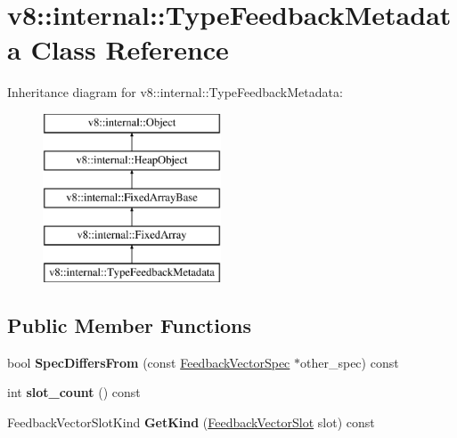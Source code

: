 \hypertarget{classv8_1_1internal_1_1_type_feedback_metadata}{}\section{v8\+:\+:internal\+:\+:Type\+Feedback\+Metadata Class Reference}
\label{classv8_1_1internal_1_1_type_feedback_metadata}
Inheritance diagram for v8\+:\+:internal\+:\+:Type\+Feedback\+Metadata\+:\begin{figure}[H]
\begin{center}
\leavevmode
\includegraphics[height=5.000000cm]{classv8_1_1internal_1_1_type_feedback_metadata}
\end{center}
\end{figure}
\subsection*{Public Member Functions}
\begin{DoxyCompactItemize}
\item 
bool {\bfseries Spec\+Differs\+From} (const \hyperlink{classv8_1_1internal_1_1_feedback_vector_spec}{Feedback\+Vector\+Spec} $\ast$other\+\_\+spec) const \hypertarget{classv8_1_1internal_1_1_type_feedback_metadata_a48a580f15b0cc818124cf600202e3d9e}{}\label{classv8_1_1internal_1_1_type_feedback_metadata_a48a580f15b0cc818124cf600202e3d9e}

\item 
int {\bfseries slot\+\_\+count} () const \hypertarget{classv8_1_1internal_1_1_type_feedback_metadata_ac98b508aed599f792822f7c8d514f3df}{}\label{classv8_1_1internal_1_1_type_feedback_metadata_ac98b508aed599f792822f7c8d514f3df}

\item 
Feedback\+Vector\+Slot\+Kind {\bfseries Get\+Kind} (\hyperlink{classv8_1_1internal_1_1_feedback_vector_slot}{Feedback\+Vector\+Slot} slot) const \hypertarget{classv8_1_1internal_1_1_type_feedback_metadata_af68eec47f1102d8a5edcc181242726b4}{}\label{classv8_1_1internal_1_1_type_feedback_metadata_af68eec47f1102d8a5edcc181242726b4}

\end{DoxyCompactItemize}

